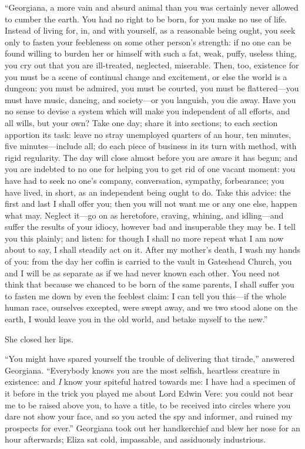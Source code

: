 \enquote{Georgiana, a more vain and absurd animal than you was certainly
	never allowed to cumber the earth. You had no right to be born, for you
	make no use of life. Instead of living for, in, and with yourself, as a
	reasonable being ought, you seek only to fasten your feebleness on some
	other person's strength: if no one can be found willing to burden her or
	himself with such a fat, weak, puffy, useless thing, you cry out that
	you are ill-treated, neglected, miserable. Then, too, existence for you
	must be a scene of continual change and excitement, or else the world is
	a dungeon: you must be admired, you must be courted, you must be
	flattered---you must have music, dancing, and society---or you languish,
	you die away. Have you no sense to devise a system which will make you
	independent of all efforts, and all wills, but your own? Take one day;
	share it into sections; to each section apportion its task: leave no
	stray unemployed quarters of an hour, ten minutes, five
	minutes---include all; do each piece of business in its turn with
	method, with rigid regularity. The day will close almost before you are
	aware it has begun; and you are indebted to no one for helping you to
	get rid of one vacant moment: you have had to seek no one's company,
	conversation, sympathy, forbearance; you have lived, in short, as an
	independent being ought to do. Take this advice: the first and last I
	shall offer you; then you will not want me or any one else, happen what
	may. Neglect it---go on as heretofore, craving, whining, and
	idling---and suffer the results of your idiocy, however bad and
	insuperable they may be. I tell you this plainly; and listen: for
	though I shall no more repeat what I am now about to say, I shall
	steadily act on it. After my mother's death, I wash my hands of you:
	from the day her coffin is carried to the vault in Gateshead Church, you
	and I will be as separate as if we had never known each other. You need
	not think that because we chanced to be born of the same parents, I
	shall suffer you to fasten me down by even the feeblest claim: I can
	tell you this---if the whole human race, ourselves excepted, were swept
	away, and we two stood alone on the earth, I would leave you in the old
	world, and betake myself to the new.}

She closed her lips.

\enquote{You might have spared yourself the trouble of delivering that
	tirade,} answered Georgiana. \enquote{Everybody knows you are the most
	selfish, heartless creature in existence: and \emph{I} know your
	spiteful hatred towards me: I have had a specimen of it before in the
	trick you played me about Lord Edwin Vere: you could not bear me to be
	raised above you, to have a title, to be received into circles where you
	dare not show your face, and so you acted the spy and informer, and
	ruined my prospects for ever.} Georgiana took out her handkerchief and
blew her nose for an hour afterwards; Eliza sat cold, impassable, and
assiduously industrious.

